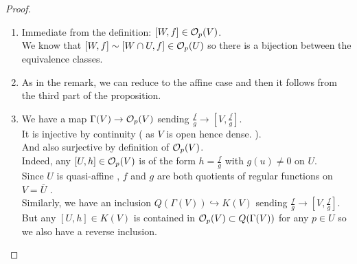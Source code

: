 \documentclass[../main.tex]{subfiles}
\begin{document}
\begin{proof}
\begin{enumerate}
\item Immediate from the definition: $ [ W,f] \in \mathcal{O}_p( V)  $.\\
We know that $ [ W,f] \sim [ W\cap U, f] \in \mathcal{O}_p( U)  $ so there is a bijection between the equivalence classes.\item As in the remark, we can reduce to the affine case and then it follows from the third part of the proposition.
\item We have a map $\Gamma( V) \to \mathcal{O}_p( V) $ sending $\frac{f}{g}\to [ V, \frac{f}{g}] $.\\
	It is injective by continuity ( as $V$ is open hence dense. ).\\
	And also surjective by definition of $\mathcal{O}_p( V) $.\\
	Indeed, any $ [ U,h] \in \mathcal{O}_p( V) $ is of the form $h = \frac{f}{g}$ with $g( u) \neq 0$ on $U$.\\
	Since $U$ is quasi-affine , $f$ and $g$ are both quotients of regular functions  on $ V = \overline{U} $ .\\
	Similarly, we have an inclusion $ Q( \Gamma( V) ) \hookrightarrow K( V) $ sending $ \frac{f}{g}\to   [ V, \frac{f}{g}] $.\\
	But any $ [ U, h] \in K( V) $ is contained in $\mathcal{O}_p( V) \subset Q( \Gamma( V) )  $ for any $p\in U$ so we also have a reverse inclusion.
\end{enumerate}

\end{proof}
\end{document}
